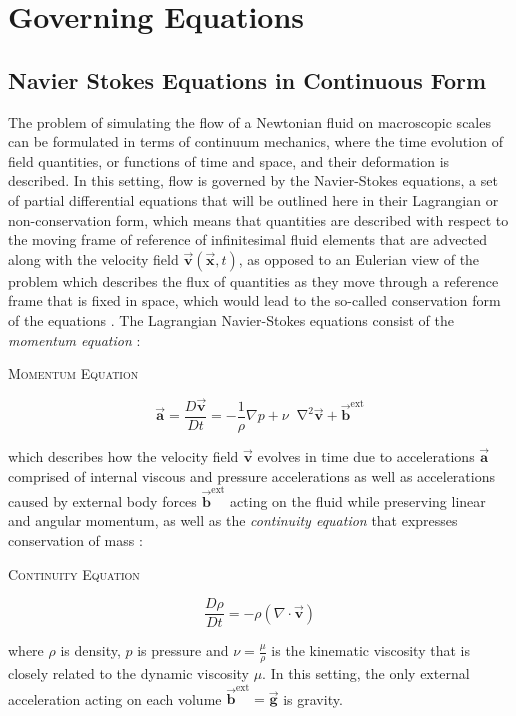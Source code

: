 \documentclass[conference]{IEEEtran}
\newcommand*\Laplace{\mathop{}\!\mathbin\nabla^2}
\newcommand\vek[1]{\vec{\bm{#1}}}
\newcommand\br[1]{\left(#1\right)}
\newcommand\divergence{{\nabla\cdot}}
\newcommand{\equationnamed}[2]{%
  \setlength{\fboxsep}{2pt} %
  \setlength{\fboxrule}{0.01pt}
  \begin{center}
    \begin{minipage}{\linewidth}
      \begin{center}\textsc{#1}\end{center}
      #2
    \end{minipage}
  \end{center}
}
\begin{document}
\section{Governing Equations}
\subsection{Navier Stokes Equations in Continuous Form}
The problem of simulating the flow of a Newtonian fluid on macroscopic scales can be formulated in terms of continuum mechanics, where the time evolution of field quantities, or functions of time and space, and their deformation is described. In this setting, flow is governed by the Navier-Stokes equations, a set of partial differential equations that will be outlined here in their Lagrangian or non-conservation form, which means that quantities are described with respect to the moving frame of reference of infinitesimal fluid elements that are advected along with the velocity field $\vek{v}\br{\vek{x}, t}$, as opposed to an Eulerian view of the problem which describes the flux of quantities as they move through a reference frame that is fixed in space, which would lead to the so-called conservation form of the equations \cite{anderson}. 
The Lagrangian Navier-Stokes equations consist of the \emph{momentum equation} \cite{tutorial2019}:
\equationnamed{Momentum Equation}{
    \begin{equation}\label{eq:momentum}
        \vek{a} = \frac{D\vek{v}}{Dt} = -\frac{1}{\rho}\nabla p + \nu \Laplace \vek{v} + \vek{b}^\text{ext}
    \end{equation}
}
which describes how the velocity field $\vek{v}$ evolves in time due to accelerations $\vek{a}$ comprised of internal viscous and pressure accelerations as well as accelerations caused by external body forces $\vek{b}^\text{ext}$ acting on the fluid while preserving linear and angular momentum, as well as the \emph{continuity equation} that expresses conservation of mass \cite{anderson}:
\equationnamed{Continuity Equation}{
  \begin{equation}\label{eq:continuity}
    \frac{D\rho}{Dt} = -\rho\br{\divergence \vek{v}}
  \end{equation}
}
where $\rho$ is density, $p$ is pressure and $\nu=\frac{\mu}{\rho}$ is the kinematic viscosity that is closely related to the dynamic viscosity $\mu$. In this setting, the only external acceleration acting on each volume $\vek{b}^\text{ext}=\vek{g}$ is gravity.
\end{document}
